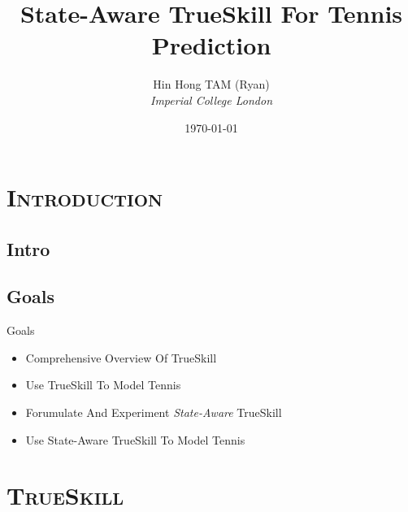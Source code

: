 \documentclass[xcolor=x11names,compress]{beamer}
\renewcommand{\(}{\begin{columns}}
\renewcommand{\)}{\end{columns}}
\newcommand{\<}[1]{\begin{column}{#1}}
\renewcommand{\>}{\end{column}}
\begin{document}
\section{\scshape Introduction}
\subsection{Intro}
\begin{frame}
\title{State-Aware TrueSkill For Tennis Prediction}
\author{
	Hin Hong TAM (Ryan)\\
	{\it Imperial College London}\\
}
\date{
	\vspace{1cm}
	\today
}
\titlepage
\end{frame}

\subsection{Goals}
\begin{frame}{Goals}
	\begin{itemize}[<+->]
		\item Comprehensive Overview Of TrueSkill
		\item Use TrueSkill To Model Tennis
		\item Forumulate And Experiment \textit{State-Aware} TrueSkill
		\item Use State-Aware TrueSkill To Model Tennis
	\end{itemize}
\end{frame}

\section{\scshape TrueSkill}
\end{document}
